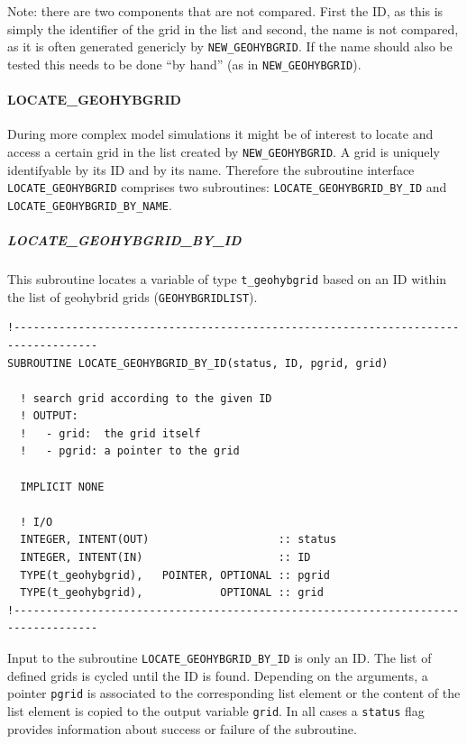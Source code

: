 \documentclass[11pt,twoside]{article}
\begin{document}
Note: there are two components that are not compared. First the
ID, as this is simply the identifier of the grid in the list and
second, the name is not compared, as it is often generated genericly
by \verb|NEW_GEOHYBGRID|. If the name should also be tested this needs
to be done ``by hand'' (as in  \verb|NEW_GEOHYBGRID|).



\paragraph{LOCATE\_GEOHYBGRID\\ \label{LOCGRID}}
During more complex model simulations it might be of interest to locate
and access a certain grid in the list created by \verb|NEW_GEOHYBGRID|.
A grid is uniquely identifyable by its ID and by its name. Therefore the
subroutine interface \verb|LOCATE_GEOHYBGRID| comprises two subroutines: 
\verb|LOCATE_GEOHYBGRID_BY_ID| and \verb|LOCATE_GEOHYBGRID_BY_NAME|.

\subparagraph{LOCATE\_GEOHYBGRID\_BY\_ID\\}
This subroutine locates a variable of type \verb|t_geohybgrid| based
on an ID within
the list of geohybrid grids (\verb|GEOHYBGRIDLIST|).
\begin{verbatim}
!-----------------------------------------------------------------------------------
SUBROUTINE LOCATE_GEOHYBGRID_BY_ID(status, ID, pgrid, grid)

  ! search grid according to the given ID
  ! OUTPUT: 
  !   - grid:  the grid itself
  !   - pgrid: a pointer to the grid

  IMPLICIT NONE

  ! I/O
  INTEGER, INTENT(OUT)                    :: status
  INTEGER, INTENT(IN)                     :: ID
  TYPE(t_geohybgrid),   POINTER, OPTIONAL :: pgrid      
  TYPE(t_geohybgrid),            OPTIONAL :: grid      
!-----------------------------------------------------------------------------------
\end{verbatim}
Input to the subroutine \verb|LOCATE_GEOHYBGRID_BY_ID| is only
an ID. The list of defined grids is cycled until the ID is found.
Depending on the arguments, a pointer \verb|pgrid| is associated to
the corresponding list 
element or the content of the list element is copied to the output
variable \verb|grid|. In all cases a \verb|status| flag provides information
about success or failure of the subroutine.
\end{document}
